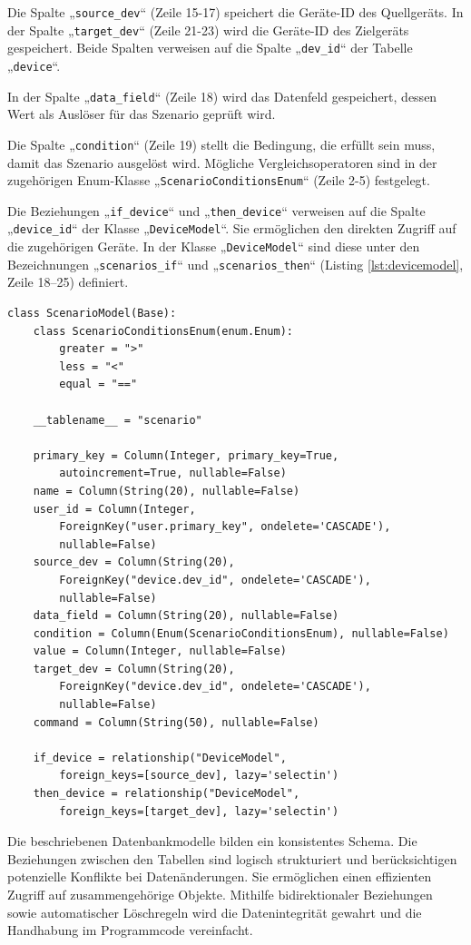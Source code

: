 \documentclass[12pt, letterpaper]{article}
\begin{document}
  \par Die Spalte „\texttt{source\_dev}“ (Zeile 15-17) speichert die Geräte-ID des Quellgeräts. In der Spalte „\texttt{target\_dev}“ (Zeile 21-23) wird die Geräte-ID des Zielgeräts gespeichert. Beide Spalten verweisen auf die Spalte „\texttt{dev\_id}“ der Tabelle „\texttt{device}“.
  \par In der Spalte „\texttt{data\_field}“ (Zeile 18) wird das Datenfeld gespeichert, dessen Wert als Auslöser für das Szenario geprüft wird.
  \par Die Spalte „\texttt{condition}“ (Zeile 19) stellt die Bedingung, die erfüllt sein muss, damit das Szenario ausgelöst wird. Mögliche Vergleichsoperatoren sind in der zugehörigen Enum-Klasse „\texttt{ScenarioConditionsEnum}“ (Zeile 2-5) festgelegt.
  \par Die Beziehungen „\texttt{if\_device}“ und „\texttt{then\_device}“ verweisen auf die Spalte „\texttt{device\_id}“ der Klasse „\texttt{DeviceModel}“. Sie ermöglichen den direkten Zugriff auf die zugehörigen Geräte. In der Klasse „\texttt{DeviceModel}“ sind diese unter den Bezeichnungen „\texttt{scenarios\_if}“ und „\texttt{scenarios\_then}“ (Listing \ref{lst:devicemodel}, Zeile 18–25) definiert.
  \begin{lstlisting}[style=mypython, label={lst:scenariomodel}, caption={models.py: ScenarioModel}]
  class ScenarioModel(Base):
    class ScenarioConditionsEnum(enum.Enum):
        greater = ">"
        less = "<"
        equal = "=="

    __tablename__ = "scenario"

    primary_key = Column(Integer, primary_key=True, 
        autoincrement=True, nullable=False)
    name = Column(String(20), nullable=False)
    user_id = Column(Integer, 
        ForeignKey("user.primary_key", ondelete='CASCADE'), 
        nullable=False)
    source_dev = Column(String(20), 
        ForeignKey("device.dev_id", ondelete='CASCADE'), 
        nullable=False)
    data_field = Column(String(20), nullable=False)
    condition = Column(Enum(ScenarioConditionsEnum), nullable=False)
    value = Column(Integer, nullable=False)
    target_dev = Column(String(20), 
        ForeignKey("device.dev_id", ondelete='CASCADE'), 
        nullable=False)
    command = Column(String(50), nullable=False)

    if_device = relationship("DeviceModel", 
        foreign_keys=[source_dev], lazy='selectin')
    then_device = relationship("DeviceModel", 
        foreign_keys=[target_dev], lazy='selectin')
  \end{lstlisting}
  \par Die beschriebenen Datenbankmodelle bilden ein konsistentes Schema. Die Beziehungen zwischen den Tabellen sind logisch strukturiert und berücksichtigen potenzielle Konflikte bei Datenänderungen. Sie ermöglichen einen effizienten Zugriff auf zusammengehörige Objekte. Mithilfe bidirektionaler Beziehungen sowie automatischer Löschregeln wird die Datenintegrität gewahrt und die Handhabung im Programmcode vereinfacht.
\end{document}
